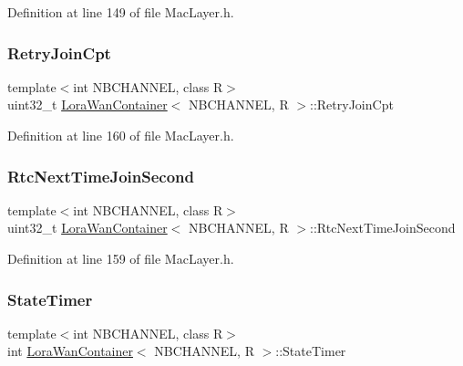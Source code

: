 Definition at line 149 of file Mac\+Layer.\+h.

\mbox{\label{class_lora_wan_container_aaf9bed2385f02a1396f1e3bf68a71494}} 
\subsubsection{\texorpdfstring{Retry\+Join\+Cpt}{RetryJoinCpt}}
{\footnotesize\ttfamily template$<$int N\+B\+C\+H\+A\+N\+N\+EL, class R$>$ \\
uint32\+\_\+t \mbox{\hyperlink{class_lora_wan_container}{Lora\+Wan\+Container}}$<$ N\+B\+C\+H\+A\+N\+N\+EL, R $>$\+::Retry\+Join\+Cpt}



Definition at line 160 of file Mac\+Layer.\+h.

\mbox{\label{class_lora_wan_container_a9b25f6e36173b50f63d594afe560d4d6}} 
\subsubsection{\texorpdfstring{Rtc\+Next\+Time\+Join\+Second}{RtcNextTimeJoinSecond}}
{\footnotesize\ttfamily template$<$int N\+B\+C\+H\+A\+N\+N\+EL, class R$>$ \\
uint32\+\_\+t \mbox{\hyperlink{class_lora_wan_container}{Lora\+Wan\+Container}}$<$ N\+B\+C\+H\+A\+N\+N\+EL, R $>$\+::Rtc\+Next\+Time\+Join\+Second}



Definition at line 159 of file Mac\+Layer.\+h.

\mbox{\label{class_lora_wan_container_a1fd80f37a0842928631d917de271cfe9}} 
\subsubsection{\texorpdfstring{State\+Timer}{StateTimer}}
{\footnotesize\ttfamily template$<$int N\+B\+C\+H\+A\+N\+N\+EL, class R$>$ \\
int \mbox{\hyperlink{class_lora_wan_container}{Lora\+Wan\+Container}}$<$ N\+B\+C\+H\+A\+N\+N\+EL, R $>$\+::State\+Timer}



